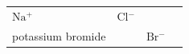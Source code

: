 \begin{enumerate}[noitemsep, label=\textbf{\arabic*}. ]
{\begin{tabular}[t]{|l|l|l|l|}
    
        \begin{math}\mathrm{Na}{}^{+}\end{math} &
    
    
        \begin{math}\mathrm{Cl}{}^{-}\end{math} &
    
    
     \tabularnewline\cline{1-1}\cline{2-2}\cline{3-3}\cline{4-4}
    
    
        potassium bromide &
    
    
         &
    
    
        \begin{math}\mathrm{Br}{}^{-}\end{math} &
    
    
     \tabularnewline\cline{1-1}\cline{2-2}\cline{3-3}\cline{4-4}
    

\end{tabular}}
\end{enumerate}

